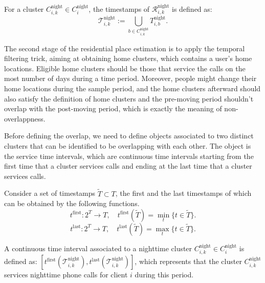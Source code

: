\clearpage\newpage
\begin{definition}
For a cluster $C^{\text{night}}_{i, k} \in C^{\text{night}}_i$, the timestamps of $\mathcal{R}^{\text{night}}_{i, k}$ is defined as:
$$
\mathcal{T}^{\text{night}}_{i, k} := \bigcup_{b \in C^{\text{night}}_{i, k}} T^{\text{night}}_{i, b}.
$$
\end{definition}

The second stage of the residential place estimation is to apply the temporal filtering trick, aiming at obtaining home clusters, which contains a user's home locations. Eligible home clusters should be those that service the calls on the most number of days during a time period. Moreover, people might change their home locations during the sample period, and the home clusters afterward should also satisfy the definition of home clusters and the pre-moving period shouldn't overlap with the post-moving period, which is exactly the meaning of non-overlappness.

Before defining the overlap, we need to define objects associated to two distinct clusters that can be identified to be overlapping with each other. The object is the service time intervals, which are continuous time intervals starting from the first time that a cluster services calls and ending at the last time that a cluster services calls.

\begin{function}
Consider a set of timestamps $\tilde{T} \subset T$, the first and the last timestamps of which can be obtained by the following functions.
$$
t^{\text{first}}: 2^{T} \rightarrow T, \quad t^{\text{first}}(\tilde{T}) = \min_t \{t \in \tilde{T}\}.
$$
$$
t^{\text{last}}: 2^{T} \rightarrow T, \quad t^{\text{last}}(\tilde{T}) = \max_t \{t \in \tilde{T}\}.
$$
\end{function}

\begin{definition}
A continuous time interval associated to a nighttime cluster $C^{\text{night}}_{i, k} \in C^{\text{night}}_i$ is defined as: $[t^{\text{first}}(\mathcal{T}^{\text{night}}_{i, k}), t^{\text{last}}(\mathcal{T}^{\text{night}}_{i, k})]$, which represents that the cluster $C^{\text{night}}_{i, k}$ services nighttime phone calls for client $i$ during this period.
\end{definition}

